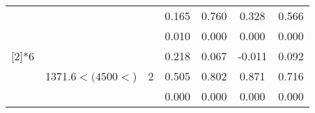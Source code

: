 \begin{table}[htbp]
\begin{tabular}{ccccccc}
          &       &       & 0.165  & 0.760  & 0.328  & 0.566  \\
          &       &       & 0.010  & 0.000  & 0.000  & 0.000  \bigstrut\\\cline{4-7}\noalign{\smallskip}
    \multirow{3}[2]{*}{6} & \multirow{3}[2]{2.5cm}{1371.6$< (4500<$)} & \multirow{3}[2]{*}{2} & 0.218  & 0.067  & -0.011  & 0.092  \\
          &       &       & 0.505  & 0.802  & 0.871  & 0.716  \\
          &       &       & 0.000  & 0.000  & 0.000  & 0.000  \\
    \bottomrule
    \end{tabular}%
  \label{tab:Set1SWJD}%
\end{table}%
